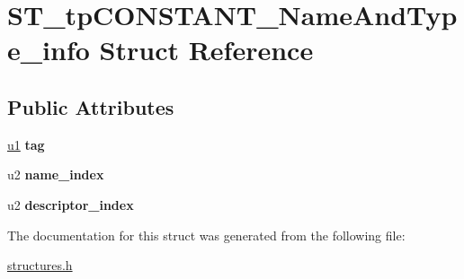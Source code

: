 \hypertarget{structST__tpCONSTANT__NameAndType__info}{}\section{S\+T\+\_\+tp\+C\+O\+N\+S\+T\+A\+N\+T\+\_\+\+Name\+And\+Type\+\_\+info Struct Reference}
\label{structST__tpCONSTANT__NameAndType__info}
\subsection*{Public Attributes}
\begin{DoxyCompactItemize}
\item 
\mbox{\label{structST__tpCONSTANT__NameAndType__info_ab00ff85978e96f0a7d6564de3294e937}} 
\mbox{\hyperlink{structures_8h_ad9f4cdb6757615aae2fad89dab3c5470}{u1}} {\bfseries tag}
\item 
\mbox{\label{structST__tpCONSTANT__NameAndType__info_af8707e5e5e8e53b872bb7a11ad83f6d7}} 
u2 {\bfseries name\+\_\+index}
\item 
\mbox{\label{structST__tpCONSTANT__NameAndType__info_a2d16e6d0fdf32e0eaa26951e744697e5}} 
u2 {\bfseries descriptor\+\_\+index}
\end{DoxyCompactItemize}


The documentation for this struct was generated from the following file\+:\begin{DoxyCompactItemize}
\item 
\mbox{\hyperlink{structures_8h}{structures.\+h}}\end{DoxyCompactItemize}
